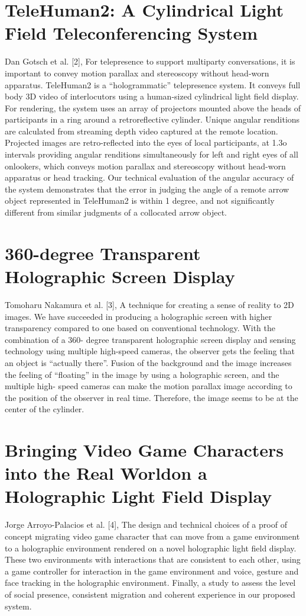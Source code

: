 \documentclass{fisatproject}
\begin{document}
\section{TeleHuman2: A Cylindrical Light Field Teleconferencing System }
\par Dan Gotsch et al. [2],  For telepresence to support multiparty conversations, it is important to convey motion parallax and stereoscopy without head-worn apparatus. TeleHuman2 is a “hologrammatic” telepresence system. It conveys full body 3D video of interlocutors using a human-sized cylindrical light field display. For rendering, the system uses an array of projectors mounted above the heads of participants in a ring around a retroreflective cylinder. Unique angular renditions are calculated from streaming depth video captured at the remote location. Projected images are retro-reflected into the eyes of local participants, at 1.3o intervals providing angular renditions simultaneously for left and right eyes of all onlookers, which conveys motion parallax and stereoscopy without head-worn apparatus or head tracking. Our technical evaluation of the angular accuracy of the system demonstrates that the error in judging the angle of a remote arrow object represented in TeleHuman2 is within 1 degree, and not significantly different from similar judgments of a collocated arrow object.
\section{360-degree Transparent Holographic Screen Display}
\par Tomoharu Nakamura et al. [3], A technique for creating a sense of reality to 2D images. We have succeeded in producing a holographic screen with higher transparency compared to one based on conventional technology. With the combination of a 360- degree transparent holographic screen display and sensing technology using multiple high-speed cameras, the observer gets the feeling that an object is “actually there”. Fusion of the background and the image increases the feeling of “floating” in the image by using a holographic screen, and the multiple high- speed cameras can make the motion parallax image according to the position of the observer in real time. Therefore, the image seems to be at the center of the cylinder.
\section{Bringing Video Game Characters into the Real Worldon a Holographic Light Field Display}
\par Jorge Arroyo-Palacios et al. [4],   The design and technical choices of a proof of concept migrating video game character that can move from a game environment to a holographic environment rendered on a novel holographic light field display.  These two environments with interactions that are consistent to each other, using a game controller for interaction in the game environment and voice, gesture and face tracking in the holographic environment. Finally,  a study to assess the level of social presence, consistent migration and coherent experience in our proposed system.
\end{document}

